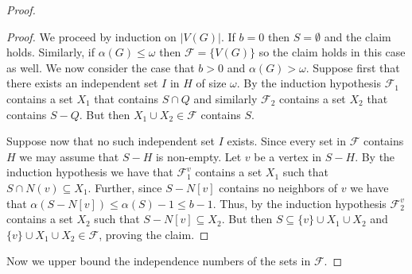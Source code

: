 \documentclass[11pt]{amsart}
\newcommand{\cal}{\mathcal}
\newcounter{tbox}
\newcommand{\sta}[1]{\vspace*{0.3cm}\refstepcounter{tbox}\noindent{ \parbox{\textwidth}{(\thetbox) \emph{#1}}}\vspace*{0.3cm}}
\begin{document}
\begin{proof}
%

\begin{proof}
We proceed by induction on $|V(G)|$. If $b=0$ then $S=\emptyset$ and the claim holds. 
Similarly, if $\alpha(G) \leq \omega$ then ${\cal F}=\{V(G)\}$ so the claim holds in this case as well.
%
We now consider the case that $b > 0$ and $\alpha(G) > \omega$.
%
Suppose first that there exists an independent set $I$ in $H$ of size $\omega$. By the induction hypothesis ${\cal F}_1$ contains a set $X_1$ that contains $S \cap Q$ and similarly ${\cal F}_2$ contains a set $X_2$ that contains $S - Q$. But then $X_1 \cup X_2 \in {\cal F}$ contains $S$. 

Suppose now that no such independent set $I$ exists. 
Since every set in ${\cal F}$ contains $H$ we may assume that $S - H$ is non-empty. 
Let $v$ be a vertex in $S - H$. 
%
By the induction hypothesis we have that ${\cal F}_1^v$ contains a set $X_1$ such that $S \cap N(v) \subseteq X_1$. Further, since $S - N[v]$ contains no neighbors of $v$ we have that $\alpha(S - N[v]) \leq \alpha(S) - 1 \leq b - 1$. Thus, by the induction hypothesis 
 ${\cal F}_2^v$ contains a set $X_2$ such that $S - N[v] \subseteq X_2$.
But then $S \subseteq \{v\} \cup X_1 \cup X_2$ and $\{v\} \cup X_1 \cup X_2 \in {\cal F}$, proving the claim.
\end{proof}

Now we upper bound the independence numbers of the sets in ${\cal F}$.


\end{proof}
\end{document}
